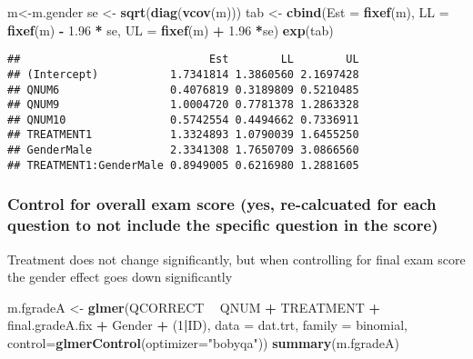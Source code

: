 \documentclass[]{article}
\newenvironment{Shaded}{\begin{snugshade}}{\end{snugshade}}
\newcommand{\KeywordTok}[1]{\textcolor[rgb]{0.13,0.29,0.53}{\textbf{#1}}}
\newcommand{\DataTypeTok}[1]{\textcolor[rgb]{0.13,0.29,0.53}{#1}}
\newcommand{\DecValTok}[1]{\textcolor[rgb]{0.00,0.00,0.81}{#1}}
\newcommand{\FloatTok}[1]{\textcolor[rgb]{0.00,0.00,0.81}{#1}}
\newcommand{\StringTok}[1]{\textcolor[rgb]{0.31,0.60,0.02}{#1}}
\newcommand{\OperatorTok}[1]{\textcolor[rgb]{0.81,0.36,0.00}{\textbf{#1}}}
\newcommand{\NormalTok}[1]{#1}
\begin{document}
\begin{Shaded}
\begin{Highlighting}[]
\NormalTok{m<-m.gender}
\NormalTok{se <-}\StringTok{ }\KeywordTok{sqrt}\NormalTok{(}\KeywordTok{diag}\NormalTok{(}\KeywordTok{vcov}\NormalTok{(m)))}
\NormalTok{tab <-}\StringTok{ }\KeywordTok{cbind}\NormalTok{(}\DataTypeTok{Est =} \KeywordTok{fixef}\NormalTok{(m), }\DataTypeTok{LL =} \KeywordTok{fixef}\NormalTok{(m) }\OperatorTok{-}\StringTok{ }\FloatTok{1.96} \OperatorTok{*}\StringTok{ }\NormalTok{se, }\DataTypeTok{UL =} \KeywordTok{fixef}\NormalTok{(m) }\OperatorTok{+}\StringTok{ }\FloatTok{1.96} \OperatorTok{*}\NormalTok{se)}
\KeywordTok{exp}\NormalTok{(tab)}
\end{Highlighting}
\end{Shaded}

\begin{verbatim}
##                             Est        LL        UL
## (Intercept)           1.7341814 1.3860560 2.1697428
## QNUM6                 0.4076819 0.3189809 0.5210485
## QNUM9                 1.0004720 0.7781378 1.2863328
## QNUM10                0.5742554 0.4494662 0.7336911
## TREATMENT1            1.3324893 1.0790039 1.6455250
## GenderMale            2.3341308 1.7650709 3.0866560
## TREATMENT1:GenderMale 0.8949005 0.6216980 1.2881605
\end{verbatim}

\subsubsection{Control for overall exam score (yes, re-calcuated for
each question to not include the specific question in the
score)}\label{control-for-overall-exam-score-yes-re-calcuated-for-each-question-to-not-include-the-specific-question-in-the-score}

Treatment does not change significantly, but when controlling for final
exam score the gender effect goes down significantly

\begin{Shaded}
\begin{Highlighting}[]
\NormalTok{m.fgradeA <-}\StringTok{ }\KeywordTok{glmer}\NormalTok{(QCORRECT }\OperatorTok{~}\StringTok{ }\NormalTok{QNUM }\OperatorTok{+}\StringTok{ }\NormalTok{TREATMENT }\OperatorTok{+}\StringTok{ }\NormalTok{final.gradeA.fix }\OperatorTok{+}\StringTok{ }\NormalTok{Gender }\OperatorTok{+}\StringTok{ }\NormalTok{(}\DecValTok{1}\OperatorTok{|}\NormalTok{ID), }
                \DataTypeTok{data =}\NormalTok{ dat.trt, }
                \DataTypeTok{family =}\NormalTok{ binomial, }\DataTypeTok{control=}\KeywordTok{glmerControl}\NormalTok{(}\DataTypeTok{optimizer=}\StringTok{"bobyqa"}\NormalTok{))}
\KeywordTok{summary}\NormalTok{(m.fgradeA)}
\end{Highlighting}
\end{Shaded}
\end{document}
